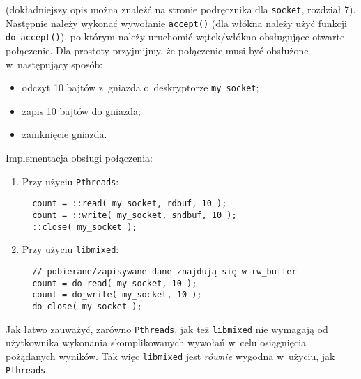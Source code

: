 \documentclass[12pt]{mwart}
\newcommand{\code}{\texttt}
\newcommand{\procbr}{()}
\newcommand{\function}[1]{\code{#1\procbr}}
\begin{document}
  (dokładniejszy opis można znaleźć na stronie podręcznika dla \code{socket}, rozdział 7). Następnie należy wykonać wywołanie \function{accept} 
  (dla włókna należy użyć funkcji \function{do\_accept}), po którym
  należy uruchomić wątek/włókno obsługujące otwarte połączenie. 
Dla prostoty przyjmijmy, że połączenie musi być obsłużone w~następujący sposób:
  \begin{itemize}
    \item odczyt 10 bajtów z~gniazda o~deskryptorze \code{my\_socket};
    \item zapis 10 bajtów do gniazda;
    \item zamknięcie gniazda.
  \end{itemize}
  Implementacja obsługi połączenia:
  \begin{enumerate}
    \item Przy użyciu \code{Pthreads}:
\begin{verbatim}
  count = ::read( my_socket, rdbuf, 10 );
  count = ::write( my_socket, sndbuf, 10 );
  ::close( my_socket );
\end{verbatim}
    \item Przy użyciu \code{libmixed}:
\begin{verbatim}
  // pobierane/zapisywane dane znajdują się w rw_buffer
  count = do_read( my_socket, 10 ); 
  count = do_write( my_socket, 10 );
  do_close( my_socket );
\end{verbatim}
  \end{enumerate}
\par
\indent
  Jak łatwo zauważyć, zarówno \code{Pthreads}, jak też \code{libmixed} nie wymagają od użytkownika wykonania skomplikowanych
  wywołań w~celu osiągnięcia pożądanych wyników. Tak więc \code{libmixed} jest \emph{równie} wygodna w~użyciu, jak \code{Pthreads}.
\par
\end{document}
